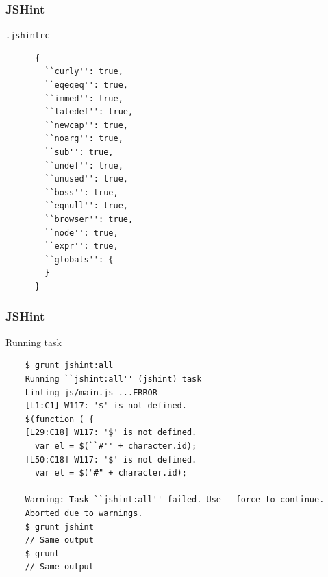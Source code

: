 \begin{frame}[fragile]
  \frametitle{JSHint}
  \begin{block}{\texttt{.jshintrc}}
    {\tiny
    \begin{verbatim}
      {
        ``curly'': true,
        ``eqeqeq'': true,
        ``immed'': true, 
        ``latedef'': true,
        ``newcap'': true,   
        ``noarg'': true,
        ``sub'': true,  
        ``undef'': true,    
        ``unused'': true,
        ``boss'': true,
        ``eqnull'': true,
        ``browser'': true,
        ``node'': true,
        ``expr'': true,
        ``globals'': {
        } 
      }
    \end{verbatim}
    }
  \end{block}
\end{frame}

\begin{frame}[fragile]
  \frametitle{JSHint}
  \begin{block}{Running task}
  {\scriptsize
    \begin{verbatim}
    $ grunt jshint:all
    Running ``jshint:all'' (jshint) task
    Linting js/main.js ...ERROR
    [L1:C1] W117: '$' is not defined.
    $(function ( {
    [L29:C18] W117: '$' is not defined.
      var el = $(``#'' + character.id);
    [L50:C18] W117: '$' is not defined.
      var el = $("#" + character.id);

    Warning: Task ``jshint:all'' failed. Use --force to continue.
    Aborted due to warnings.
    $ grunt jshint
    // Same output
    $ grunt
    // Same output
    \end{verbatim}
  }
  \end{block}
\end{frame}
